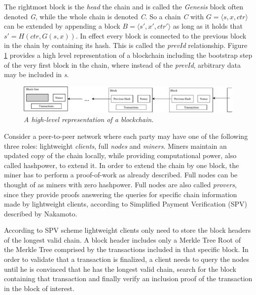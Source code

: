 \documentclass[10pt,a4paper]{article}
\theoremstyle{plain}
\theoremstyle{definition}
\begin{document}
The rightmost block is the \textit{head} the chain and is called the \textit{Genesis} block often
denoted \textit{G}, while the whole chain is denoted \textit{C}. So a chain \textit{C} with
$G = \langle s, x, ctr \rangle$ can be extended by appending a block $B = \langle s', x', ctr'
\rangle$ as long as it holds that $s' = H(ctr, G(s,x))$. In effect every block is connected to the
previous block in the chain by containing its hash. This is called the \textit{prevId} relationship.
Figure \ref{fig:abstract_chain} provides a high level representation of a blockchain including the
bootstrap step of the very first block in the chain, where instead of the \textit{prevId},
arbitrary data may be included in \textit{s}.

\begin{figure}[h!]
	\begin{center}
		\includegraphics[scale=0.7]{figures/abstract_chain.pdf}
	\end{center}
	\caption{\textit{A high-level representation of a blockchain. }}
	\label{fig:abstract_chain}
\end{figure}


Consider a peer-to-peer network where each party may have one of the following three roles:
lightweight \textit{clients}, full \textit{nodes} and \textit{miners}.
Miners maintain an updated copy of the chain locally, while providing computational power, also
called hashpower, to extend it. In order to extend the chain by one block, the miner has to perform
a proof-of-work as already described.
Full nodes can be thought of as miners with zero hashpower. Full nodes are also called
\textit{provers}, since they provide proofs  answering the queries for specific chain information
made by lightweight clients, according to Simplified Payment Verification (SPV) described by
Nakamoto\cite{Nakamoto}.

According to SPV scheme lightweight clients only need to store the block headers of the longest
valid chain. A block header includes only a Merkle Tree Root of the Merkle Tree comprised by
the transactions included in that specific block. In order to validate that a transaction is
finalized, a client needs to query the nodes until he is convinced that he has the longest
valid chain, search for the block containing that transaction and finally verify an inclusion
proof of the transaction in the block of interest.
\end{document}
